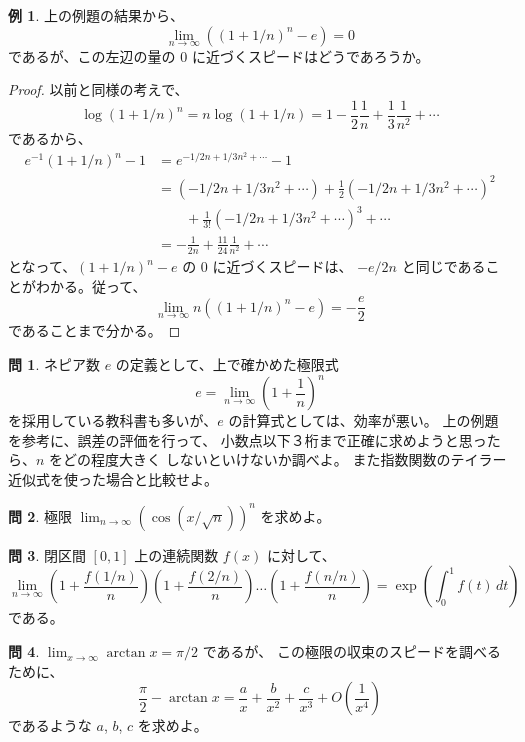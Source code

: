 \documentclass[a4paper]{jsarticle}
\theoremstyle{definition}
\newtheorem{Example}[Theorem]{例}
\newtheorem{Exercise}{問}%
\theoremstyle{remark}
\begin{document}
\begin{Example}
上の例題の結果から、
\[
\lim_{n\to \infty}((1 + 1/n)^n - e) = 0
\]
であるが、この左辺の量の $0$ に近づくスピードはどうであろうか。
\end{Example}

\begin{proof}
以前と同様の考えで、
\[
\log (1 + 1/n)^n = n\log(1+1/n) =
1 - \frac{1}{2}\frac{1}{n} + \frac{1}{3}\frac{1}{n^2} + \cdots
\]
であるから、
\begin{align*}
e^{-1}(1+1/n)^n - 1 &= e^{-1/2n + 1/3n^2 + \cdots} - 1\\
&= \left( -1/2n + 1/3n^2 + \cdots \right) +
\frac{1}{2} \left( -1/2n + 1/3n^2 + \cdots \right)^2\\
&\qquad + \frac{1}{3!} \left( -1/2n + 1/3n^2 + \cdots \right)^3 +
\cdots\\
&= - \frac{1}{2n} + \frac{11}{24} \frac{1}{n^2} + \cdots
\end{align*}
となって、$(1+1/n)^n - e$ の $0$ に近づくスピードは、
$-e/2n$ と同じであることがわかる。従って、
\[
\lim_{n \to \infty} n((1+1/n)^n - e) = - \frac{e}{2}
\]
であることまで分かる。
\end{proof}

\begin{Exercise}
ネピア数 $e$ の定義として、上で確かめた極限式
\[
e = \lim_{n \to \infty} \left(1 + \frac{1}{n} \right)^n
\]
を採用している教科書も多いが、$e$ の計算式としては、効率が悪い。
上の例題を参考に、誤差の評価を行って、
小数点以下３桁まで正確に求めようと思ったら、$n$ をどの程度大きく
しないといけないか調べよ。
また指数関数のテイラー近似式を使った場合と比較せよ。
\end{Exercise}

\begin{Exercise}
極限 $\displaystyle\lim_{n \to \infty} (\cos(x/\sqrt{n}))^n$ を求めよ。
\end{Exercise}

\begin{Exercise}
閉区間 $[0,1]$ 上の連続関数 $f(x)$ に対して、
\[
\lim_{n \to \infty} 
\left( 
1 + \frac{f(1/n)}{n} 
\right)
\left( 
1 + \frac{f(2/n)}{n} 
\right)
\dots 
\left( 
1 + \frac{f(n/n)}{n} 
\right)
= \exp\left(\int_0^1 f(t)\,dt\right)
\]
である。
\end{Exercise}

\begin{Exercise}
$\displaystyle \lim_{x \to \infty} \arctan x = \pi/2$ であるが、
この極限の収束のスピードを調べるために、
\[
\frac{\pi}{2} - \arctan x = \frac{a}{x} + \frac{b}{x^2} + \frac{c}{x^3} 
+ O\left(\frac{1}{x^4}\right)
\]
であるような $a$, $b$, $c$ を求めよ。
\end{Exercise}
\end{document}
